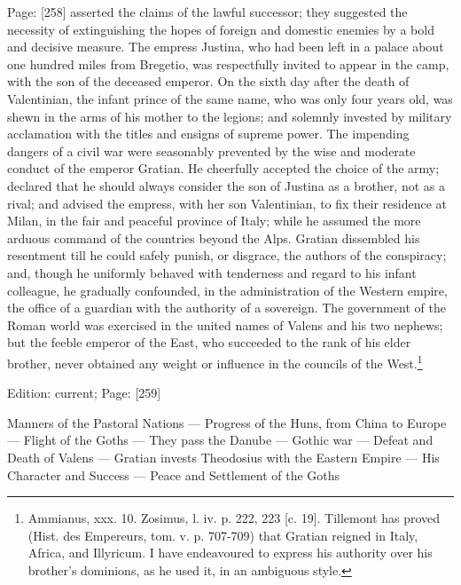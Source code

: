 Page: [258] asserted the claims of the lawful successor; they suggested the necessity of extinguishing the hopes of foreign and domestic enemies by a bold and decisive measure. The empress Justina, who had been left in a palace about one hundred miles from Bregetio, was respectfully invited to appear in the camp, with the son of the deceased emperor. On the sixth day after the death of Valentinian, the infant prince of the same name, who was only four years old, was shewn in the arms of his mother to the legions; and solemnly invested by military acclamation with the titles and ensigns of supreme power. The impending dangers of a civil war were seasonably prevented by the wise and moderate conduct of the emperor Gratian. He cheerfully accepted the choice of the army; declared that he should always consider the son of Justina as a brother, not as a rival; and advised the empress, with her son Valentinian, to fix their residence at Milan, in the fair and peaceful province of Italy; while he assumed the more arduous command of the countries beyond the Alps. Gratian dissembled his resentment till he could safely punish, or disgrace, the authors of the conspiracy; and, though he uniformly behaved with tenderness and regard to his infant colleague, he gradually confounded, in the administration of the Western empire, the office of a guardian with the authority of a sovereign. The government of the Roman world was exercised in the united names of Valens and his two nephews; but the feeble emperor of the East, who succeeded to the rank of his elder brother, never obtained any weight or influence in the councils of the West.\footnote{Ammianus, xxx. 10. Zosimus, l. iv. p. 222, 223 [c. 19]. Tillemont has proved (Hist. des Empereurs, tom. v. p. 707-709) that Gratian reigned in Italy, Africa, and Illyricum. I have endeavoured to express his authority over his brother\texthebrew{}’s dominions, as he used it, in an ambiguous style.}

Edition: current; Page: [259]


Manners of the Pastoral Nations \texthebrew{—} Progress of the Huns, from China to Europe \texthebrew{—} Flight of the Goths \texthebrew{—} They pass the Danube \texthebrew{—} Gothic war \texthebrew{—} Defeat and Death of Valens \texthebrew{—} Gratian invests Theodosius with the Eastern Empire \texthebrew{—} His Character and Success \texthebrew{—} Peace and Settlement of the Goths

